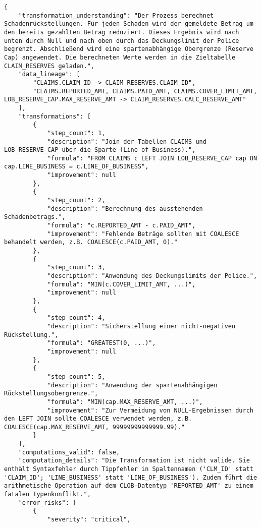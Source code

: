 \begin{lstlisting}[caption={Ausgabe: GEMINI 2.5 Pro Anwendungsfall 10 Konsistenzdurchlauf},label={gemini_case10_prompt2}]
{
    "transformation_understanding": "Der Prozess berechnet Schadenrückstellungen. Für jeden Schaden wird der gemeldete Betrag um den bereits gezahlten Betrag reduziert. Dieses Ergebnis wird nach unten durch Null und nach oben durch das Deckungslimit der Police begrenzt. Abschließend wird eine spartenabhängige Obergrenze (Reserve Cap) angewendet. Die berechneten Werte werden in die Zieltabelle CLAIM_RESERVES geladen.",
    "data_lineage": [
        "CLAIMS.CLAIM_ID -> CLAIM_RESERVES.CLAIM_ID",
        "CLAIMS.REPORTED_AMT, CLAIMS.PAID_AMT, CLAIMS.COVER_LIMIT_AMT, LOB_RESERVE_CAP.MAX_RESERVE_AMT -> CLAIM_RESERVES.CALC_RESERVE_AMT"
    ],
    "transformations": [
        {
            "step_count": 1,
            "description": "Join der Tabellen CLAIMS und LOB_RESERVE_CAP über die Sparte (Line of Business).",
            "formula": "FROM CLAIMS c LEFT JOIN LOB_RESERVE_CAP cap ON cap.LINE_BUSINESS = c.LINE_OF_BUSINESS",
            "improvement": null
        },
        {
            "step_count": 2,
            "description": "Berechnung des ausstehenden Schadenbetrags.",
            "formula": "c.REPORTED_AMT - c.PAID_AMT",
            "improvement": "Fehlende Beträge sollten mit COALESCE behandelt werden, z.B. COALESCE(c.PAID_AMT, 0)."
        },
        {
            "step_count": 3,
            "description": "Anwendung des Deckungslimits der Police.",
            "formula": "MIN(c.COVER_LIMIT_AMT, ...)",
            "improvement": null
        },
        {
            "step_count": 4,
            "description": "Sicherstellung einer nicht-negativen Rückstellung.",
            "formula": "GREATEST(0, ...)",
            "improvement": null
        },
        {
            "step_count": 5,
            "description": "Anwendung der spartenabhängigen Rückstellungsobergrenze.",
            "formula": "MIN(cap.MAX_RESERVE_AMT, ...)",
            "improvement": "Zur Vermeidung von NULL-Ergebnissen durch den LEFT JOIN sollte COALESCE verwendet werden, z.B. COALESCE(cap.MAX_RESERVE_AMT, 99999999999999.99)."
        }
    ],
    "computations_valid": false,
    "computation_details": "Die Transformation ist nicht valide. Sie enthält Syntaxfehler durch Tippfehler in Spaltennamen ('CLM_ID' statt 'CLAIM_ID'; 'LINE_BUSINESS' statt 'LINE_OF_BUSINESS'). Zudem führt die arithmetische Operation auf dem CLOB-Datentyp 'REPORTED_AMT' zu einem fatalen Typenkonflikt.",
    "error_risks": [
        {
            "severity": "critical",

\end{lstlisting}
